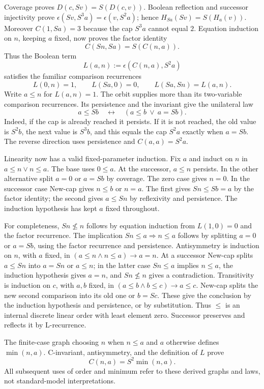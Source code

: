\documentclass[11pt,letterpaper]{article}
\theoremstyle{definition}\newtheorem{definition}[theorem]{Definition}
\theoremstyle{remark}\newtheorem{remark}[theorem]{Remark}
\begin{document}
Coverage proves $D(c,Sv)=S(D(c,v))$. Boolean reflection and successor
injectivity prove
$\epsilon(Sv,S^3a)=\epsilon(v,S^2a)$; hence
$H_{Sa}(Sv)=S(H_a(v))$. Moreover $C(1,Sa)=3$ because the cap
$S^3a$ cannot equal $2$. Equation induction on $n$, keeping $a$ fixed,
now proves the factor identity
\[
                            C(Sn,Sa)=S(C(n,a)).\tag{C-factor}
\]
Thus the Boolean term
\[
                          L(a,n):=\epsilon(C(n,a),S^2a)
\]
satisfies the familiar comparison recurrences
\[
 L(0,n)=1,\qquad L(Sa,0)=0,\qquad L(Sa,Sn)=L(a,n).
\tag{L-recurrence}
\]
Write $a\le n$ for $L(a,n)=1$. The orbit supplies more than its
two-variable comparison recurrences. Its persistence and the invariant
give the unilateral law
\[
 a\le Sb\quad\longleftrightarrow\quad (a\le b\ \lor\ a=Sb).
 \tag{New-cap}
\]
Indeed, if the cap is already reached it persists. If it is not reached,
the old value is $S^2b$, the next value is $S^3b$, and this equals the
cap $S^2a$ exactly when $a=Sb$. The reverse direction uses persistence
and $C(a,a)=S^2a$.

Linearity now has a valid fixed-parameter induction. Fix $a$ and induct
on $n$ in $a\le n\lor n\le a$. The base uses $0\le a$. At the
successor, $a\le n$ persists. In the other alternative split $a=0$
or $a=Sb$ by coverage. The zero case gives $n=0$. In the successor
case New-cap gives $n\le b$ or $n=a$. The first gives $Sn\le Sb=a$
by the factor identity; the second gives $a\le Sn$ by reflexivity and
persistence. The induction hypothesis has kept $a$ fixed throughout.

For completeness, $Sn\not\le n$ follows by equation induction from
$L(1,0)=0$ and the factor recurrence. The implication
$Sn\le a\Rightarrow n\le a$ follows by splitting $a=0$ or $a=Sb$,
using the factor recurrence and persistence. Antisymmetry is induction
on $n$, with $a$ fixed, in
$(a\le n\wedge n\le a)\to a=n$. At a successor New-cap splits
$a\le Sn$ into $a=Sn$ or $a\le n$; in the latter case $Sn\le a$
implies $n\le a$, the induction hypothesis gives $a=n$, and
$Sn\not\le n$ gives a contradiction. Transitivity is induction on
$c$, with $a,b$ fixed, in
$(a\le b\wedge b\le c)\to a\le c$. New-cap splits the new second
comparison into its old one or $b=Sc$. These give the conclusion by
the induction hypothesis and persistence, or by substitution.
Thus $\le$ is an internal discrete linear order with least element
zero. Successor preserves and reflects it by L-recurrence.

The finite-case graph choosing $n$ when $n\le a$ and $a$ otherwise
defines $\min(n,a)$. C-invariant, antisymmetry, and the definition
of $L$ prove
\[
                          C(n,a)=S^2\min(n,a).
\tag{C-min}
\]
All subsequent uses of order and minimum refer to these derived
graphs and laws, not standard-model interpretations.
\end{document}
